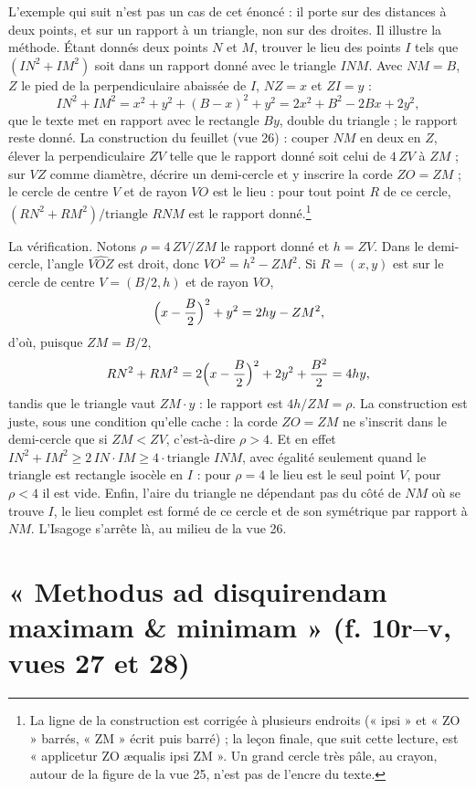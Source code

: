 \documentclass[11pt,a4paper]{article}
\begin{document}
L'exemple qui suit n'est pas un cas de cet énoncé : il porte sur des distances
à deux points, et sur un rapport à un triangle, non sur des droites. Il
illustre la méthode. Étant donnés deux points $N$ et $M$, trouver le lieu des
points $I$ tels que $(IN^2 + IM^2)$ soit dans un rapport donné avec le triangle
$INM$. Avec $NM = B$, $Z$ le pied de la perpendiculaire abaissée de $I$,
$NZ = x$ et $ZI = y$ :
\[ IN^2 + IM^2 = x^2 + y^2 + (B - x)^2 + y^2 = 2x^2 + B^2 - 2Bx + 2y^2 , \]
que le texte met en rapport avec le rectangle $By$, double du triangle ; le
rapport reste donné. La construction du feuillet (vue 26) : couper $NM$ en deux
en $Z$, élever la perpendiculaire $ZV$ telle que le rapport donné soit celui de
$4\,ZV$ à $ZM$ ; sur $VZ$ comme diamètre, décrire un demi-cercle et y inscrire
la corde $ZO = ZM$ ; le cercle de centre $V$ et de rayon $VO$ est le lieu : pour
tout point $R$ de ce cercle, $(RN^2 + RM^2)/\text{triangle }RNM$ est le rapport
donné.\footnote{La ligne de la construction est corrigée à plusieurs endroits
(« ipsi » et « ZO » barrés, « ZM » écrit puis barré) ; la leçon finale, que
suit cette lecture, est « applicetur ZO æqualis ipsi ZM ». Un grand cercle très
pâle, au crayon, autour de la figure de la vue 25, n'est pas de l'encre du
texte.}

La vérification. Notons $\rho = 4\,ZV/ZM$ le rapport donné et $h = ZV$. Dans le
demi-cercle, l'angle $\widehat{VOZ}$ est droit, donc $VO^2 = h^2 - ZM^2$. Si
$R = (x,y)$ est sur le cercle de centre $V = (B/2, h)$ et de rayon $VO$,
\[ \Bigl(x - \frac B2\Bigr)^2 + y^2 = 2hy - ZM^2 , \]
d'où, puisque $ZM = B/2$,
\[ RN^2 + RM^2 = 2\Bigl(x - \frac B2\Bigr)^2 + 2y^2 + \frac{B^2}{2} = 4hy , \]
tandis que le triangle vaut $ZM\cdot y$ : le rapport est $4h/ZM = \rho$. La
construction est juste, sous une condition qu'elle cache : la corde $ZO = ZM$
ne s'inscrit dans le demi-cercle que si $ZM < ZV$, c'est-à-dire $\rho > 4$. Et
en effet $IN^2 + IM^2 \geq 2\,IN\cdot IM \geq 4\cdot\text{triangle }INM$, avec
égalité seulement quand le triangle est rectangle isocèle en $I$ : pour
$\rho = 4$ le lieu est le seul point $V$, pour $\rho < 4$ il est vide. Enfin,
l'aire du triangle ne dépendant pas du côté de $NM$ où se trouve $I$, le lieu
complet est formé de ce cercle et de son symétrique par rapport à $NM$. L'Isagoge
s'arrête là, au milieu de la vue 26.

\section*{« Methodus ad disquirendam maximam \& minimam » (f. 10r–v, vues 27 et 28)}
\end{document}
